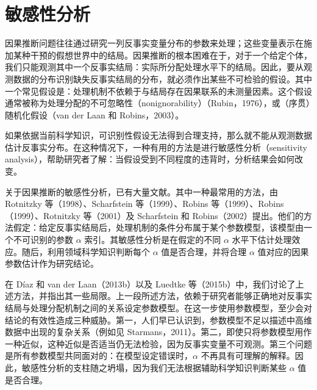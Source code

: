 \chapter{敏感性分析}
\label{ch:sensitivity-analysis}

因果推断问题往往通过研究一列反事实变量分布的参数来处理；这些变量表示在施加某种干预的假想世界中的结局。因果推断的根本困难在于，对于一个给定个体，我们只能观测其中一个反事实结局：实际所分配处理水平下的结局。因此，要从观测数据的分布识别缺失反事实结局的分布，就必须作出某些不可检验的假设。其中一个常见假设是：处理机制不依赖于与结局存在因果联系的未测量因素。这个假设通常被称为处理分配的不可忽略性（nonignorability）（Rubin，1976），或（序贯）随机化假设（van der Laan 和 Robins，2003）。

\begin{sourcebox}
如果依据当前科学知识，可识别性假设无法得到合理支持，那么就不能从观测数据估计反事实分布。在这种情况下，一种有用的方法是进行敏感性分析（sensitivity analysis），帮助研究者了解：当假设受到不同程度的违背时，分析结果会如何改变。
\end{sourcebox}

关于因果推断的敏感性分析，已有大量文献。其中一种最常用的方法，由 Rotnitzky 等（1998）、Scharfstein 等（1999）、Robins 等（1999）、Robins（1999）、Rotnitzky 等（2001）及 Scharfstein 和 Robins（2002）提出。他们的方法假定：给定反事实结局后，处理机制的条件分布属于某个参数模型，该模型由一个不可识别的参数 $\alpha$ 索引。其敏感性分析是在假定的不同 $\alpha$ 水平下估计处理效应。随后，利用领域科学知识判断每个 $\alpha$ 值是否合理，并将合理 $\alpha$ 值对应的因果参数估计作为研究结论。

在 Díaz 和 van der Laan（2013b）以及 Luedtke 等（2015b）中，我们讨论了上述方法，并指出其一些局限。上一段所述方法，依赖于研究者能够正确地对反事实结局与处理分配机制之间的关系设定参数模型。在这一步使用参数模型，至少会对结论的有效性造成三种威胁。第一，人们早已认识到，参数模型不足以描述中高维数据中出现的复杂关系（例如见 Starmans，2011）。第二，即使只将参数模型用作一种近似，这种近似是否适当仍无法检验，因为反事实变量不可观测。第三个问题是所有参数模型共同面对的：在模型设定错误时，$\alpha$ 不再具有可理解的解释。因此，敏感性分析的支柱随之坍塌，因为我们无法根据辅助科学知识判断某些 $\alpha$ 值是否合理。


